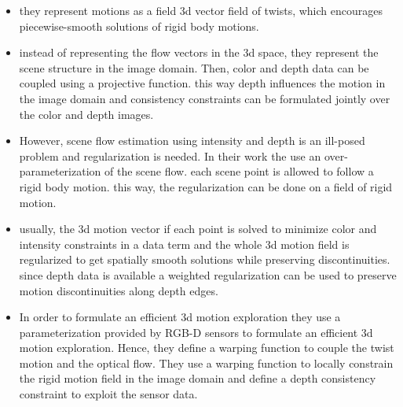 \begin{itemize}
  \item they represent motions as a field 3d vector field of twists, which encourages piecewise-smooth solutions of rigid body motions.
  \item instead of representing the flow vectors in the 3d space, they represent the scene structure in the image domain. Then, color and depth data can be coupled using a projective function. this way depth influences the motion in the image domain and consistency constraints can be formulated jointly over the color and depth images. 
  \item However, scene flow estimation using intensity and depth is an ill-posed problem and regularization is needed. In their work the use an over-parameterization of the scene flow. each scene point is allowed to follow a rigid body motion. this way, the regularization can be done on a field of rigid motion.
  \item usually, the 3d motion vector if each point is solved to minimize color and intensity constraints in a data term and the whole 3d motion field is regularized to get spatially smooth solutions while preserving discontinuities. since depth data is available a weighted regularization can be used to preserve motion discontinuities along depth edges. 
  \item In order to formulate an efficient 3d motion exploration they use a parameterization provided by RGB-D sensors to formulate an efficient 3d motion exploration. Hence, they define a warping function to couple the twist motion and the optical flow. They use a warping function to locally constrain the rigid motion field in the image domain and define a depth consistency constraint to exploit the sensor data.
\end{itemize}

